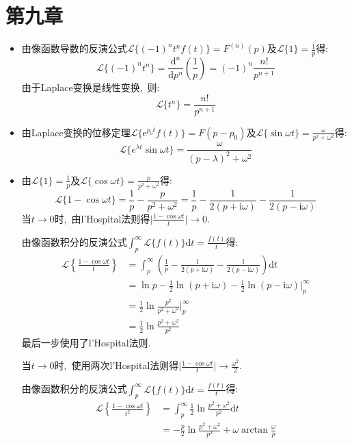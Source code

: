 \documentclass[a4paper,fontset=windows]{ctexart}
\begin{document}
\newpage
\section*{第九章}
\bigskip

\begin{itemize}

\item[1.(1)]
由像函数导数的反演公式$\mathscr{L}\{(-1)^nt^nf(t)\}=F^{(n)}(p)$及$\mathscr{L}\{1\}=\frac{1}{p}$得:
\[
\mathscr{L}\{(-1)^nt^n\}
=\frac{\mathrm{d}^n}{\mathrm{d}p^n}(\frac{1}{p})
=(-1)^n\frac{n!}{p^{n+1}}
\]
由于Laplace变换是线性变换,\ 则:
\[
\mathscr{L}\{t^n\}
=\frac{n!}{p^{n+1}}
\]

\smallskip
\item[1.(3)]
由Laplace变换的位移定理$\mathscr{L}\{\mathrm{e}^{p_0t}f(t)\}=F(p-p_0)$及$\mathscr{L}\{\sin\omega t\}=\frac{\omega}{p^2+\omega^2}$得:
\[
\mathscr{L}\{{e}^{\lambda t}\sin\omega t\}
=\frac{\omega}{(p-\lambda)^2+\omega^2}
\]

\smallskip
\item[1.(5)]
由$\mathscr{L}\{1\}=\frac{1}{p}$及$\mathscr{L}\{\cos\omega t\}=\frac{p}{p^2+\omega^2}$得:
\[
\mathscr{L}\{1-\cos\omega t\}
=\frac{1}{p}-\frac{p}{p^2+\omega^2}
=\frac{1}{p}-\frac{1}{2(p+\mathrm{i}\omega)}-\frac{1}{2(p-\mathrm{i}\omega)}
\]
当$t\rightarrow0$时,\ 由l'Hospital法则得$\big|\frac{1-\cos\omega t}{t}\big|\rightarrow0$.

由像函数积分的反演公式$\int_{p}^{\infty}\mathscr{L}\{f(t)\}\mathrm{d}t=\frac{f(t)}{t}$得:
\begin{align*}
\mathscr{L}\left\lbrace\frac{1-\cos\omega t}{t}\right\rbrace
&=\int_{p}^{\infty}\left(\frac{1}{p}-\frac{1}{2(p+\mathrm{i}\omega)}-\frac{1}{2(p-\mathrm{i}\omega)}\right)\mathrm{d}t \\
&=\ln p-\frac{1}{2}\ln(p+\mathrm{i}\omega)-\frac{1}{2}\ln(p-\mathrm{i}\omega)\bigg|_{p}^{\infty} \\
&=\frac{1}{2}\ln\frac{p^2}{p^2+\omega^2}\bigg|_{p}^{\infty} \\
&=\frac{1}{2}\ln\frac{p^2+\omega^2}{p^2}
\end{align*}
最后一步使用了l'Hospital法则.

当$t\rightarrow0$时,\ 使用两次l'Hospital法则得$\big|\frac{1-\cos\omega t}{t}\big|\rightarrow\frac{\omega^2}{2}$.

由像函数积分的反演公式$\int_{p}^{\infty}\mathscr{L}\{f(t)\}\mathrm{d}t=\frac{f(t)}{t}$得:
\begin{align*}
\mathscr{L}\left\lbrace\frac{1-\cos\omega t}{t^2}\right\rbrace 
&=\int_{p}^{\infty}\frac{1}{2}\ln\frac{p^2+\omega^2}{p^2}\mathrm{d}t \\
&=-\frac{p}{2}\ln\frac{p^2+\omega^2}{p^2}+\omega\arctan\frac{\omega}{p}
\end{align*}


\end{itemize}
\end{document}
